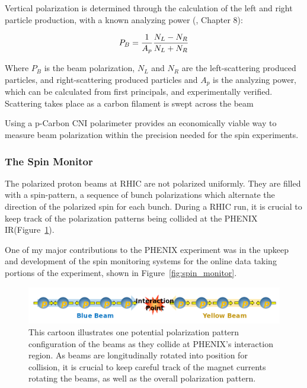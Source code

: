 Vertical polarization is determined through the calculation of the left and
right particle production, with a known analyzing power (\cite{RHIC2006},
Chapter 8):

\begin{equation}
  P_B = {{1}\over{A_p}}{{N_L-N_R}\over{N_L+N_R}}
  \label{eq:rhic_polarization}
\end{equation}

{\noindent}Where $P_B$ is the beam polarization, $N_L$ and $N_R$ are the
left-scattering produced particles, and right-scattering produced particles and
$A_p$ is the analyzing power, which can be calculated from first principals, and
experimentally verified. Scattering takes place as a carbon filament is swept
across the beam

Using a p-Carbon CNI polarimeter provides an economically viable way to measure
beam polarization within the precision needed for the spin experiments.

\subsubsection{The Spin Monitor}
\label{sec:the_spin_monitor}

The polarized proton beams at RHIC are not polarized uniformly. They are filled
with a spin-pattern, a sequence of bunch polarizations which alternate the
direction of the polarized spin for each bunch. During a RHIC run, it is crucial
to keep track of the polarization patterns being collided at the PHENIX
IR(Figure~\ref{fig:phenix_spin_collision}).

One of my major contributions to the PHENIX experiment was in the upkeep and
development of the spin monitoring systems for the online data taking portions
of the experiment, shown in Figure~\ref{fig:spin_monitor}.

\begin{figure}
  \centering
  \includegraphics[width=\linewidth]{./figures/phenix_spin_collision}
  \caption{
    This cartoon illustrates one potential polarization pattern configuration
    of the beams as they collide at PHENIX's interaction region.  As beams are
    longitudinally rotated into position for collision, it is crucial to keep
    careful track of the magnet currents rotating the beams, as well as the
    overall polarization pattern.
  }
  \label{fig:phenix_spin_collision}
\end{figure}

